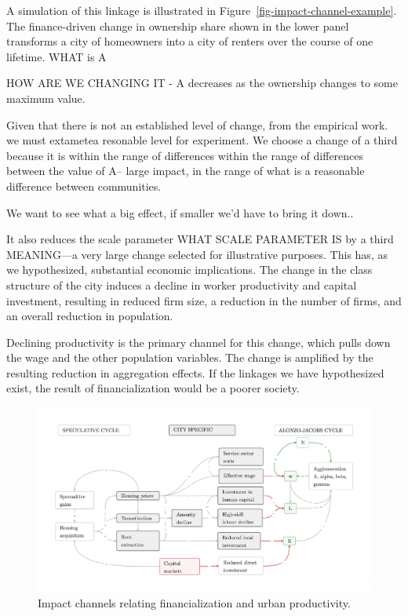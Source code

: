 A simulation of this linkage is illustrated in Figure~\ref{fig-impact-channel-example}. The finance-driven change in ownership share shown in the lower panel transforms a city of homeowners into a city of renters over the course of one lifetime. 
WHAT is A

HOW ARE WE CHANGING IT - A decreases as the ownership changes to some maximum value. 

Given that there is not an established level of change, from the empirical work. we must extametea resonable level for experiment. We choose a change of a third because it is within the range of differences within the range of differences between the value of A--
large impact, in the range of what is a reasonable difference between communities.

We want to see what a big effect, if smaller we'd have to bring it down..

It also reduces the scale parameter {\color{red}WHAT SCALE PARAMETER IS} by a third MEANING---a very large change selected for illustrative purposes. This has, as we hypothesized, substantial economic implications. The change in the class structure of the city induces a decline in worker productivity and capital investment, resulting in reduced firm size, a reduction in the number of firms, and an overall reduction in population. 

Declining productivity is the primary channel for this change, which pulls down the wage and the other population variables. The change is amplified by the resulting reduction in aggregation effects.  If the linkages we have hypothesized exist, the result of financialization would be a poorer society. 


\begin{figure}[h!tb]\label{fig-impact-channels2}
\begin{adjustwidth}{-0.24\textwidth}{-0.24\textwidth}
\centering
\includegraphics[scale=.15 ]{fig/impact-channels.png}%
\end{adjustwidth}
\caption{Impact channels relating financialization and urban productivity.}
\end{figure}

